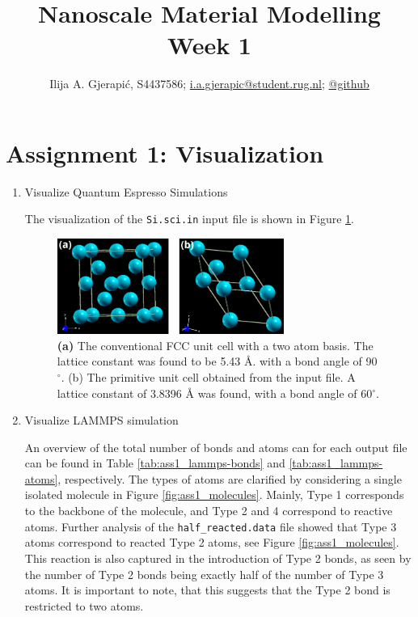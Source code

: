 \documentclass[10pt,a4paper]{labreport}
\title{Nanoscale Material Modelling
\\
\normalsize{Week 1}} %
\author{Ilija A. Gjerapić, S4437586; \href{mailto:i.a.gjerapic@student.rug.nl}{i.a.gjerapic@student.rug.nl}; \href{https://github.com/igjerapic/nmm-week1/}{@github} } %
\begin{document}
\maketitle



  

\thispagestyle{firststyle}
\newpage
\section{Assignment 1: Visualization}
\begin{enumerate}
  \item Visualize Quantum Espresso Simulations
  
  The visualization of the \texttt{Si.sci.in} input file is shown in Figure \ref{fig:ass1_cryst}. 
  \begin{figure}[h]
    \centering 
    \includegraphics[width = 0.7\textwidth]{figs/ass1_Si_cryst.png}
    \caption{\textbf{(a)} The conventional FCC unit cell with a two atom basis. The lattice constant was found to be 5.43 \AA. with a bond angle of 90$^\circ$. (b) The primitive unit cell obtained from the input file. A lattice constant of 3.8396 {\AA} was found, with a bond angle of 60$^\circ$.}
    \label{fig:ass1_cryst}
  \end{figure}

  \item Visualize LAMMPS simulation 
  
  An overview of the total number of bonds and atoms can for each output file can be found in Table \ref{tab:ass1_lammps-bonds} and \ref{tab:ass1_lammps-atoms}, respectively.
  The types of atoms are clarified by considering a single isolated molecule in Figure \ref{fig:ass1_molecules}. Mainly, Type 1 corresponds to the backbone of the molecule, and Type 2 and 4 correspond to reactive atoms. Further analysis of the \texttt{half\_reacted.data} file showed that Type 3 atoms correspond to reacted Type 2 atoms, see Figure \ref{fig:ass1_molecules}. This reaction is also captured in the introduction of Type 2 bonds, as seen by the number of Type 2 bonds being exactly half of the number of Type 3 atoms. It is important to note, that this suggests that the Type 2 bond is restricted to two atoms. 


\end{enumerate}
\end{document}
